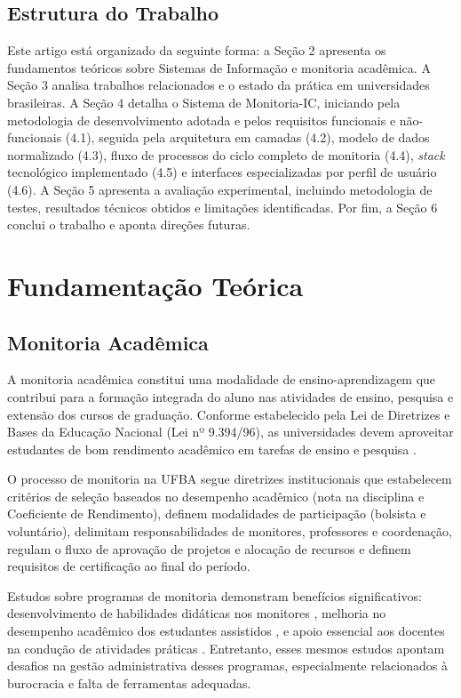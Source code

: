 \documentclass[portuguese]{sbc2025}%
\begin{document}
\subsection{Estrutura do Trabalho}

Este artigo está organizado da seguinte forma: a Seção 2 apresenta os fundamentos teóricos sobre Sistemas de Informação e monitoria acadêmica. A Seção 3 analisa trabalhos relacionados e o estado da prática em universidades brasileiras. A Seção 4 detalha o Sistema de Monitoria-IC, iniciando pela metodologia de desenvolvimento adotada e pelos requisitos funcionais e não-funcionais (4.1), seguida pela arquitetura em camadas (4.2), modelo de dados normalizado (4.3), fluxo de processos do ciclo completo de monitoria (4.4), \textit{stack} tecnológico implementado (4.5) e interfaces especializadas por perfil de usuário (4.6). A Seção 5 apresenta a avaliação experimental, incluindo metodologia de testes, resultados técnicos obtidos e limitações identificadas. Por fim, a Seção 6 conclui o trabalho e aponta direções futuras.

\section{Fundamentação Teórica}
\label{sec:background}

\subsection{Monitoria Acadêmica}

A monitoria acadêmica constitui uma modalidade de ensino-aprendizagem que contribui para a formação integrada do aluno nas atividades de ensino, pesquisa e extensão dos cursos de graduação. Conforme estabelecido pela Lei de Diretrizes e Bases da Educação Nacional (Lei nº 9.394/96), as universidades devem aproveitar estudantes de bom rendimento acadêmico em tarefas de ensino e pesquisa \cite{Brasil1996}.

O processo de monitoria na UFBA segue diretrizes institucionais que estabelecem critérios de seleção baseados no desempenho acadêmico (nota na disciplina e Coeficiente de Rendimento), definem modalidades de participação (bolsista e voluntário), delimitam responsabilidades de monitores, professores e coordenação, regulam o fluxo de aprovação de projetos e alocação de recursos e definem requisitos de certificação ao final do período.

Estudos sobre programas de monitoria demonstram benefícios significativos: desenvolvimento de habilidades didáticas nos monitores \cite{Natario2010}, melhoria no desempenho acadêmico dos estudantes assistidos \cite{Frison2016}, e apoio essencial aos docentes na condução de atividades práticas \cite{Dantas2014}. Entretanto, esses mesmos estudos apontam desafios na gestão administrativa desses programas, especialmente relacionados à burocracia e falta de ferramentas adequadas.
\end{document}
